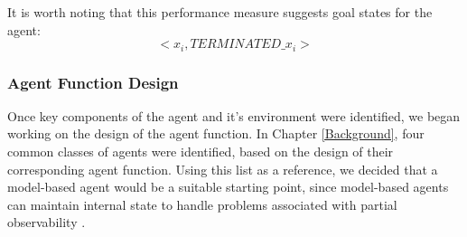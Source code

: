 
It is worth noting that this performance measure suggests goal states for the agent:
\[ <x_i, TERMINATED\_x_i> \]

\subsubsection{Agent Function Design}
Once key components of the agent and it's environment were identified, we began working on the design of the agent function. In Chapter \ref{Background}, four common classes of agents were identified, based on the design of their corresponding agent function. Using this list as a reference, we decided that a model-based agent would be a suitable starting point, since model-based agents can maintain internal state to handle problems associated with partial observability \cite{AIAMA}.

